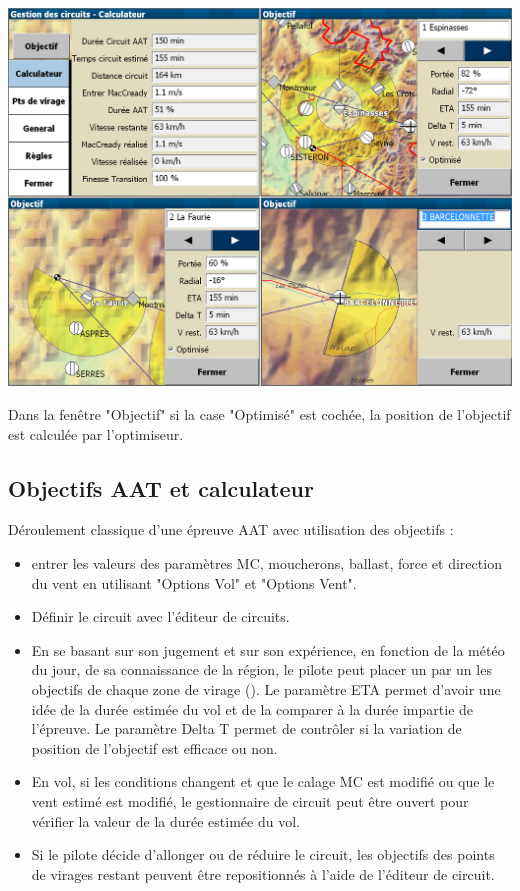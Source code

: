 \includegraphics[angle=0,width=1.2\linewidth,keepaspectratio='true']{figures/gestion_circuit_00.png}

Dans la fenêtre "Objectif" si la case "Optimisé" est cochée, la position de l'objectif est calculée par l'optimiseur.

\subsection*{Objectifs AAT et calculateur}

Déroulement classique d'une épreuve AAT avec utilisation des objectifs :
\begin{itemize}
\item entrer les valeurs des paramètres MC, moucherons, ballast, force et direction du vent en utilisant "Options Vol" et "Options Vent".
\item Définir le circuit avec l'éditeur de circuits.
\item En se basant sur son jugement et sur son expérience, en fonction de la météo du jour, de sa connaissance de la région, le pilote peut placer un par un les objectifs de chaque zone de virage (\blink{}\blink{}). Le paramètre ETA permet d'avoir une idée de la durée estimée du vol et de la comparer à la durée impartie de l'épreuve. Le paramètre Delta T permet de contrôler si la variation de position de l'objectif est efficace ou non.
\item En vol, si les conditions changent et que le calage MC est modifié ou que le vent estimé est modifié, le gestionnaire de circuit peut être ouvert pour vérifier la valeur de la durée estimée du vol.
\item Si le pilote décide d'allonger ou de réduire le circuit, les objectifs des points de virages restant peuvent être repositionnés à l'aide de l'éditeur de circuit.
\end{itemize}

